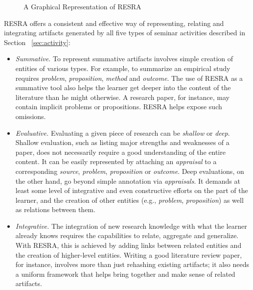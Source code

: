 \begin{figure}[htb]
    \centerline{}
    \caption{A Graphical Representation of RESRA}
    \label{fig-resra}
\end{figure}


RESRA offers a consistent and effective way of representing, relating and
integrating artifacts generated by all five types of seminar activities
described in Section ~\ref{sec:activity}:

\begin{itemize}
\item {\it Summative.\/} To represent summative artifacts involves simple
  creation of entities of various types. For example, to summarize an
  empirical study requires {\it problem\/}, {\it proposition\/}, {\it
  method\/} and {\it outcome\/}. The use of RESRA as a summative tool also
  helps the learner get deeper into the content of the literature than he
  might otherwise. A research paper, for instance, may contain implicit
  problems or propositions. RESRA helps expose such omissions.
  
\item {\it Evaluative.\/} Evaluating a given piece of research can be
  {\it shallow\/} or {\it deep\/}. Shallow evaluation, such as listing
  major strengths and weaknesses of a paper, does not necessarily require a
  good understanding of the entire content. It can be easily represented by
  attaching an {\it appraisal\/} to a corresponding {\it source}, {\it
  problem\/}, {\it proposition\/} or {\it outcome\/}. Deep evaluations, on
  the other hand, go beyond simple annotation via {\it appraisals\/}. It
  demands at least some level of integrative and even constructive efforts
  on the part of the learner, and the creation of other entities (e.g.,
  {\it problem\/}, {\it proposition\/}) as well as relations between them.
  
\item {\it Integrative.\/} The integration of new research knowledge with
  what the learner already knows requires the capabilities to relate,
  aggregate and generalize. With RESRA, this is achieved by adding links
  between related entities and the creation of higher-level entities.
  Writing a good literature review paper, for instance, involves more than
  just rehashing existing artifacts; it also needs a uniform framework that
  helps bring together and make sense of related artifacts.
  

\end{itemize}
